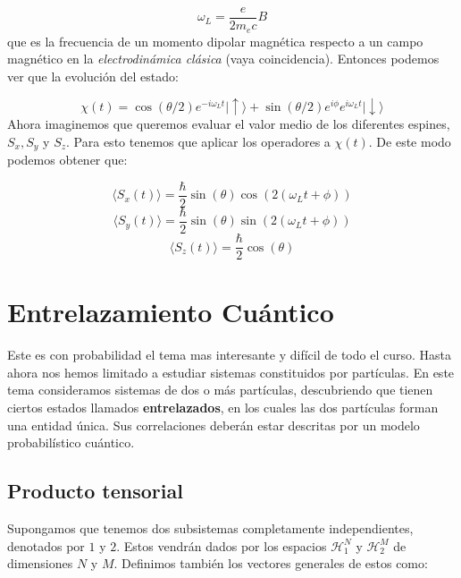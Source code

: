 \documentclass[12pt]{book}
\numberwithin{equation}{chapter}
\numberwithin{figure}{chapter}
\newcommand{\eup}{\mid \uparrow \rangle}
\newcommand{\edw}{\mid \downarrow \rangle}
\begin{document}
\begin{equation}
\omega_L = \frac{e}{2 m_e c} B
\end{equation}
que es la frecuencia de un momento dipolar magnética respecto a un campo magnético en la \textit{electrodinámica clásica} (vaya coincidencia). Entonces podemos ver que la evolución del estado:

\begin{equation}
\chi (t) =  \cos (\theta/2) e^{-i\omega_L t} \eup + \sin (\theta/2) e^{i \phi} e^{i \omega_ L t} \edw
\end{equation}
Ahora imaginemos que queremos evaluar el valor medio de los diferentes espines, $S_x,S_y$ y $S_z$. Para esto tenemos que aplicar los operadores a $\chi (t)$. De este modo podemos obtener que:

\begin{equation}
\langle S_x  (t) \rangle = \frac{\hbar}{2} \sin (\theta) \cos (2 (\omega_L t + \phi) ) 
\end{equation}
\begin{equation}
\langle S_y (t) \rangle = \frac{\hbar}{2} \sin (\theta) \sin (2 (\omega_L t + \phi) ) 
\end{equation}
\begin{equation}
\langle S_z (t) \rangle = \frac{\hbar}{2} \cos (\theta) 
\end{equation}
\newpage

\chapter{Entrelazamiento Cuántico}

Este es con probabilidad el tema mas interesante y difícil de todo el curso. Hasta ahora nos hemos limitado a estudiar sistemas constituidos por partículas. En este tema consideramos sistemas de dos o más partículas, descubriendo que tienen ciertos estados llamados \textbf{entrelazados}, en los cuales las dos partículas forman una entidad única. Sus correlaciones deberán estar descritas por un modelo probabilístico cuántico. \\

\section{Producto tensorial}

Supongamos que tenemos dos subsistemas completamente independientes, denotados por $1$ y $2$. Estos vendrán dados por los espacios $\mathcal{H}_1^N$ y $\mathcal{H}_2^M$ de dimensiones $N$ y $M$. Definimos también los vectores generales de estos como:
\end{document}
